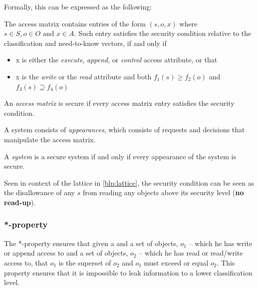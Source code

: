 Formally, this can be expressed as the following:
\begin{definition}
The access matrix contains entries of the form $(s,o,x)$ where $s \in S, o \in O \text{ and } x \in A$.
Such entry satisfies the security condition relative to the classification and need-to-know vectors, if and only if

\begin{itemize}
\item x is either the \emph{execute}, \emph{append}, or \emph{control} access attribute, or that
\item x is the \emph{write} or the \emph{read} attribute and both $f_1(s) \ge f_2(o)$ and $f_3(s) \supseteq f_4(o)$
\end{itemize}

An \emph{access matrix} is secure if every access matrix entry satisfies the security condition.

A system consists of \emph{appearances}, which consists of requests and decisions that manipulate the access matrix.

A \emph{system} is a secure system if and only if every appearance of the system is secure.
\end{definition}

Seen in context of the lattice in \cref{blp:lattice}, the security condition can be seen as the disallowance of any \ssubject{} $s$ from reading any objects above its security level (\textbf{no read-up}).

\subsubsection{*-property}
The *-property ensures that given a \principal{} and a set of objects, $o_1$ -- which he has write or append access to and a set of objects, $o_2$ -- which he has read or read/write access to, that $o_1$ is the superset of $o_2$ and $o_1$ must exceed or equal $o_2$.
This property ensures that it is impossible to leak information to a lower classification level.

